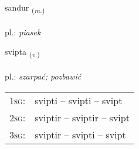 \documentclass[frontgrid, backgrid]{flacards}\usepackage[]{graphicx}\usepackage[]{xcolor}
\begin{document}
\renewcommand{\flhead}{\vskip5pt \fboxsep=0pt {\small\bfseries\footnotesize Nafnorð | rzeczownik}}
\renewcommand{\fcfoot}{\vskip5pt \fboxsep=0pt \hspace{2pt}{\small\bfseries\footnotesize 3K}}

\renewcommand{\blhead}{\vskip5pt {\small\bfseries\footnotesize Nafnorð | rzeczownik }}
\renewcommand{\bcfoot}{\vskip5pt \hspace{2pt}{\small\bfseries\footnotesize 3K}}


{sandur \small{\textsubscript{(\textit{m.})}} \\[1ex] %
\textphonetic{[santʏr]} \\
pl.: \emph{piasek} \\  [2ex]
\renewcommand*{\arraystretch}{0.8}
}

\renewcommand{\flhead}{\vskip5pt \fboxsep=0pt {\small\bfseries\footnotesize Sagnorð | czasownik}}
\renewcommand{\fcfoot}{\vskip5pt \fboxsep=0pt \hspace{2pt}{\small\bfseries\footnotesize 3K}}

\renewcommand{\blhead}{\vskip5pt {\small\bfseries\footnotesize Sagnorð | czasownik }}
\renewcommand{\bcfoot}{\vskip5pt \hspace{2pt}{\small\bfseries\footnotesize 3K}}


{svipta \small{\textsubscript{(\textit{v.})}} \\[1ex] %
\textphonetic{[svɪfta]} \\
pl.: \emph{szarpać; pozbawić} \\  [2ex]
\renewcommand*{\arraystretch}{0.8}
\begin{tabular}{p{1cm}l}
\textsc{1sg}: & svipti -- svipti -- svipt \\ 
\textsc{2sg}: & sviptir -- sviptir -- svipt \\ 
\textsc{3sg}: & sviptir -- svipti -- svipt \\ 
\end{tabular}
}
\end{document}
